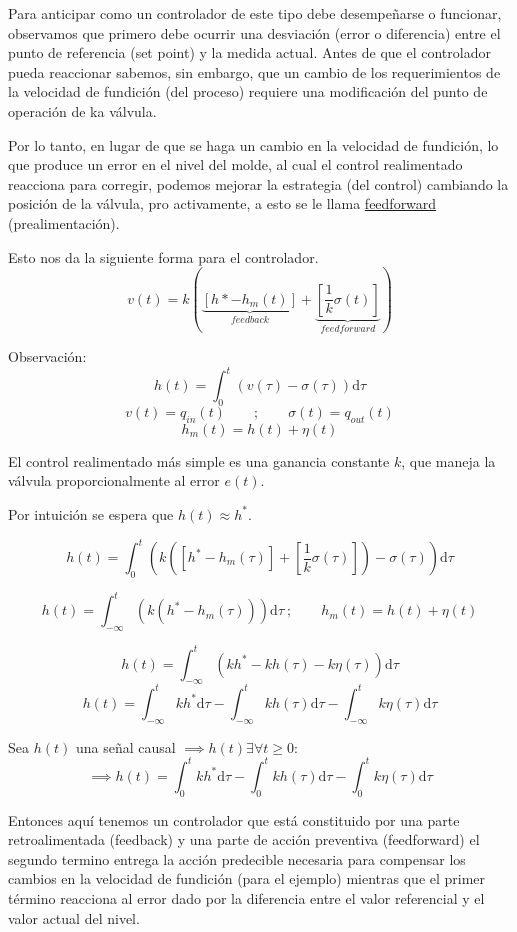 \documentclass[a4paper]{article}
\begin{document}
Para anticipar como un controlador de este tipo debe desempeñarse o funcionar, observamos que primero debe ocurrir una desviación (error o diferencia) entre el punto de referencia (set point) y la medida actual. Antes de que el controlador pueda reaccionar sabemos, sin embargo, que un cambio de los requerimientos de la velocidad de fundición (del proceso) requiere una modificación del punto de operación de ka válvula.

Por lo tanto, en lugar de que se haga un cambio en la velocidad de fundición, lo que produce un error en el nivel del molde, al cual el control realimentado reacciona para corregir, podemos mejorar la estrategia (del control) cambiando la posición de la válvula, pro activamente, a esto se le llama \underline{feedforward} (prealimentación).

Esto nos da la siguiente forma para el controlador.
\begin{equation}\label{eq:controlador_completo}
		v(t) = k(\underbrace{\left[h* - h_m(t)\right]}_{feedback}  + \underbrace{\left[\frac{1}{k} \sigma(t) \right]}_{feedforward}  )
\end{equation}

Observación:
\[h(t) = \int_{0}^{t}(v(\tau) - \sigma(\tau)) \mathrm{d}\tau\]
\[v(t) = q_{in}(t) \qquad;\qquad \sigma(t) = q_{out} (t) \]
\[h_m(t) = h(t) + \eta(t)\]

El control realimentado más simple es una ganancia constante $k$, que maneja la válvula proporcionalmente al error $e(t)$.

Por intuición se espera que $h(t) \approx h^*$.

\[h(t) = \int_{0}^{t}\left(k\left( \left[h^* - h_m(\tau) \right] + \left[ \frac{1}{k} \sigma(\tau) \right] \right) -\sigma(\tau)\right)\mathrm{d}\tau\]

\[h(t) = \int_{-\infty}^{t}\left(k(h^* - h_m(\tau)) \right) \mathrm{d}\tau~;\qquad h_m(t) = h(t) + \eta(t)\]

\[h(t) = \int_{-\infty}^{t}\left(kh^* - kh(\tau) - k\eta(\tau) \right) \mathrm{d}\tau\]
\[h(t) = \int_{-\infty}^{t}kh^*\mathrm{d}\tau - \int_{-\infty}^{t}kh(\tau) \mathrm{d}\tau - \int_{-\infty}^{t}k\eta(\tau) \mathrm{d}\tau\]

Sea $h(t)$ una señal causal $\implies h(t) \exists \forall t\ge 0 $:
\[\implies h(t) = \int_{0}^{t}kh^*\mathrm{d}\tau - \int_{0}^{t}kh(\tau)\mathrm{d}\tau - \int_{0}^{t}k\eta(\tau)\mathrm{d}\tau\]

Entonces aquí tenemos un controlador que está constituido por una parte retroalimentada (feedback) y una parte de acción preventiva (feedforward) el segundo termino entrega la acción predecible necesaria para compensar los cambios en la velocidad de fundición (para el ejemplo) mientras que el primer término reacciona al error dado por la diferencia entre el valor referencial y el valor actual del nivel.
\end{document}
